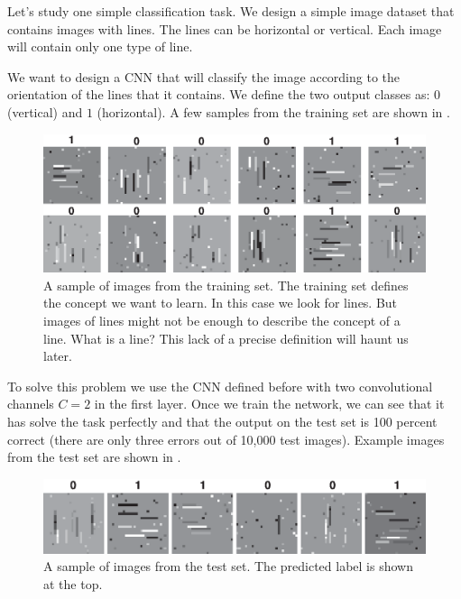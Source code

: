 Let's study one simple classification task. We design a simple image dataset that contains images with lines. The lines can be horizontal or vertical. Each image will contain only one type of line. 

We want to design a CNN that will classify the image according to the orientation of the lines that it contains. We define the two output classes as: $0$ (vertical) and $1$ (horizontal). A few samples from the training set are shown in \fig{\ref{fig:convolutional_neural_nets:oriented_bars_cnn_trainingset}}.
\begin{figure}[h!]
\centerline{
\includegraphics[width=1.0\linewidth]{./figures/convolutional_neural_nets/oriented_bars_cnn_trainingset.eps}}
\caption{A sample of images from the training set. The training set defines the concept we want to learn. In this case we look for lines. But images of lines might not be enough to describe the concept of a line. What is a line? This lack of a precise definition will haunt us later.}
\label{fig:convolutional_neural_nets:oriented_bars_cnn_trainingset}
\end{figure}

To solve this problem we use the CNN defined before with two convolutional channels $C=2$ in the first layer. Once we train the network, we can see that it has solve the task perfectly and that the output on the test set is 100 percent correct (there are only three errors out of 10,000 test images). Example images from the test set are shown in \fig{\ref{fig:convolutional_neural_nets:oriented_bars_cnn_testset}}.
\begin{figure}[h!]
\includegraphics[width=1\linewidth]{./figures/convolutional_neural_nets/oriented_bars_cnn_testset.eps}
\caption{A sample of images from the test set. The predicted label is shown at the top.}
\label{fig:convolutional_neural_nets:oriented_bars_cnn_testset}
\end{figure}


